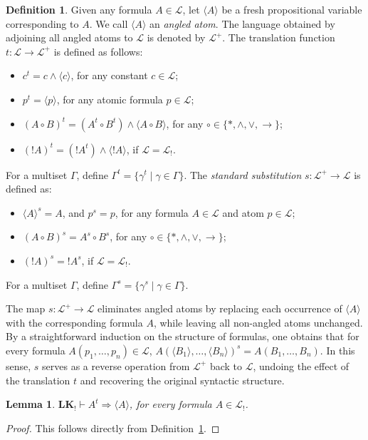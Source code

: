 \documentclass[12pt,a4paper]{article}
\theoremstyle{plain}
\newtheorem{lemma}[theorem]{Lemma}
\theoremstyle{definition}
\newtheorem{definition}[theorem]{Definition}
\newcommand{\LKajab}{\mathbf{LK_!}}
\begin{document}
\begin{definition}  \label{Translation}
Given any formula $A \in \mathcal{L}$, let $\langle A \rangle$ be a fresh propositional variable corresponding to $A$. We call $\langle A \rangle$ an \emph{angled atom}. The language obtained by adjoining all angled atoms to $\mathcal{L}$ is denoted by $\mathcal{L}^{+}$. The translation function $t:\mathcal{L} \to \mathcal{L}^{+}$ is defined as follows:
\begin{itemize}
\item[$\bullet$] 
$c^t=c \wedge \langle c \rangle$, for any constant $c \in \mathcal{L}$;
\item[$\bullet$] 
$p^t= \langle p \rangle$, for any atomic formula $p \in \mathcal{L}$;
\item[$\bullet$]
$(A \circ B) ^t = (A^t \circ B^t) \wedge \langle A \circ B \rangle$, for any $\circ \in \{*, \wedge, \vee, \to\}$;
\item[$\bullet$]
$(!A)^t =(!A^t) \wedge \langle !A \rangle$, if $\mathcal{L}=\mathcal{L}_!$.
\end{itemize}
For a multiset $\Gamma$, define  $\Gamma^t = \{\gamma^t \mid \gamma \in \Gamma\}$. 
The \emph{standard substitution} $s: {\mathcal{L}}^+ \to \mathcal{L}$ is defined as:
\begin{itemize}
\item[$\bullet$]
$\langle A \rangle^s = A$, and $p^s=p$, for any formula $A \in \mathcal{L}$ and atom $p \in \mathcal{L}$;
\item[$\bullet$]
$(A \circ B) ^s = A^s \circ B^s$, for any $\circ \in \{*, \wedge, \vee, \to\}$;
\item[$\bullet$]
$(! A)^s =! A^s$, if $\mathcal{L}=\mathcal{L}_!$.
\end{itemize}
For a multiset $\Gamma$, define $\Gamma^s =\{\gamma^s \mid \gamma \in \Gamma\}$.  
\end{definition}
The map $s:\mathcal{L}^{+}\to\mathcal{L}$ eliminates angled atoms by replacing each occurrence of $\langle A \rangle$ with the corresponding formula $A$, while leaving all non-angled atoms unchanged. By a straightforward induction on the structure of formulas, one obtains that for every formula $A(p_1,\dots,p_n)\in\mathcal{L}$,
$
A(\langle B_1\rangle,\dots,\langle B_n\rangle)^s
= A(B_1,\dots,B_n)$.
In this sense, $s$ serves as a reverse operation from $\mathcal{L}^{+}$ back to $\mathcal{L}$, undoing the effect of the translation $t$ and recovering the original syntactic structure.

\begin{lemma}\label{TranslationAndAtoms}
$\LKajab \vdash A^t \Rightarrow \langle A \rangle$, for every formula $A \in \mathcal{L}_!$. 
\end{lemma}
\begin{proof}
This follows directly from Definition~\ref{Translation}.
\end{proof}
\end{document}
